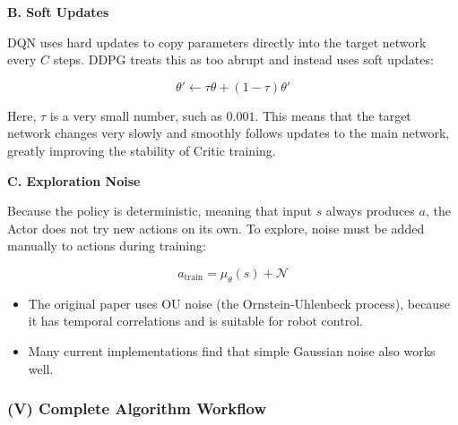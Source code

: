 \textbf{B. Soft Updates}

DQN uses hard updates to copy parameters directly into the target network every \(C\) steps. DDPG treats this as too abrupt and instead uses soft updates:

\[
\theta'
\leftarrow
\tau\theta+(1-\tau)\theta'
\]

Here, \(\tau\) is a very small number, such as \(0.001\). This means that the target network changes very slowly and smoothly follows updates to the main network, greatly improving the stability of Critic training.

\textbf{C. Exploration Noise}

Because the policy is deterministic, meaning that input \(s\) always produces \(a\), the Actor does not try new actions on its own. To explore, noise must be added manually to actions during training:

\[
a_{\mathrm{train}}
=
\mu_\theta(s)+\mathcal{N}
\]

\begin{itemize}
\tightlist
\item
  The original paper uses OU noise (the Ornstein-Uhlenbeck process), because it has temporal correlations and is suitable for robot control.
\item
  Many current implementations find that simple Gaussian noise also works well.
\end{itemize}

\hypertarget{v-complete-algorithm-workflow}{%
\subsubsection{(V) Complete Algorithm Workflow}\label{v-complete-algorithm-workflow}}

